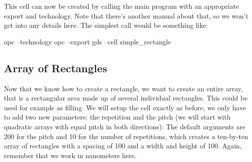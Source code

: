 
This cell can now be created by calling the main program with an appropriate export and technology. Note that there's another manual about that, so we won't get
into any details here. The simplest call would be something like:
\begin{shellcode}
    opc --technology opc --export gds --cell simple_rectangle
\end{shellcode}

\subsection{Array of Rectangles}
Now that we know how to create a rectangle, we want to create an entire array, that is a rectangular area made up of several individual rectangles. This could be
used for example as filling. We will setup the cell exactly as before, we only have to add two new parameters: the repetition and the pitch (we will start with
quadratic arrays with equal pitch in both directions):
The default arguments are \num{200} for the pitch and \num{10} for the number of repetitions, which creates a ten-by-ten array of rectangles with a spacing of
\num{100} and a width and height of \num{100}. Again, remember that we work in nanometers here.

